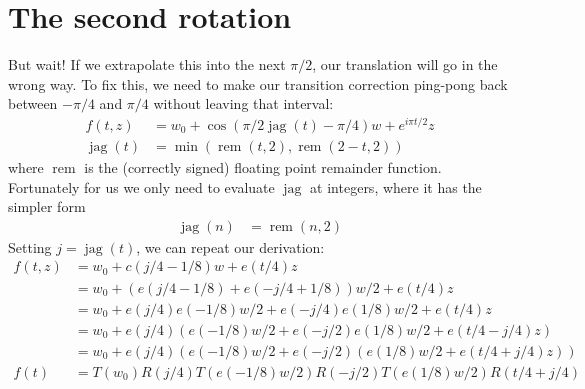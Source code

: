 \documentclass[11pt, oneside]{article}
\begin{document}
\section{The second rotation}

But wait!  If we extrapolate this into the next $\pi/2$, our translation will go in the wrong way.  To fix this, we
need to make our transition correction ping-pong back between $-\pi/4$ and $\pi/4$ without leaving that
interval:
\begin{align*}
f(t,z) &= w_0 + \cos(\pi/2 \operatorname{jag}(t) - \pi/4) w + e^{i \pi t/2} z \\
\operatorname{jag}(t) &= \min(\operatorname{rem}(t, 2), \operatorname{rem}(2-t,2))
\end{align*}
where $\operatorname{rem}$ is the (correctly signed) floating point remainder function.  Fortunately for us we
only need to evaluate $\operatorname{jag}$ at integers, where it has the simpler form
\begin{align*}
\operatorname{jag}(n) &= \operatorname{rem}(n, 2)
\end{align*}
Setting $j = \operatorname{jag}(t)$, we can repeat our derivation:
\begin{align*}
f(t,z) &= w_0 + c(j/4 - 1/8) w + e(t/4) z \\
  &= w_0 + (e(j/4 - 1/8) + e(-j/4 + 1/8)) w/2 + e(t/4) z \\
  &= w_0 + e(j/4)e(-1/8) w/2 + e(-j/4)e(1/8) w/2 + e(t/4) z \\
  &= w_0 + e(j/4)(e(-1/8) w/2 + e(-j/2)e(1/8) w/2 + e(t/4-j/4) z) \\
  &= w_0 + e(j/4)(e(-1/8) w/2 + e(-j/2) (e(1/8) w/2 + e(t/4+j/4) z)) \\
f(t) &= T(w_0) R(j/4) T(e(-1/8) w/2) R(-j/2) T(e(1/8) w/2) R(t/4+j/4)
\end{align*}
\end{document}
